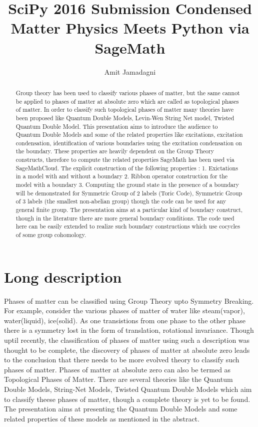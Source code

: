 \documentclass[a4paper,10pt]{article}
\title{SciPy 2016 Submission Condensed Matter Physics Meets Python via SageMath}
\author{Amit Jamadagni}
\date{}
\begin{document}
\maketitle

\begin{abstract}
Group theory has been used to classify various phases of matter, but the same cannot be applied to phases of matter at absolute zero which are called as topological phases of matter. 
In order to classify such topological phases of matter many theories have been proposed like Quantum Double Models, Levin-Wen String Net model, Twisted Quantum Double Model. This presentation aims to 
introduce the audience to Quantum Double Models and some of the related properties like excitations, excitation condensation, identification of various boundaries using 
the excitation condensation on the boundary. These properties are heavily dependent on the Group Theory constructs, therefore to compute the related properties SageMath has been used via SageMathCloud. 
The explicit construction of the following properties : 
 1. Exictations in a model with and without a boundary
 2. Ribbon operator construction for the model with a boundary
 3. Computing the ground state in the presence of a boundary
will be demonstrated for Symmetric Group of 2 labels (Toric Code), Symmetric Group of 3 labels (the smallest non-abelian group) though the code can be used for any general finite group. 
The presentation aims at a particular kind of boundary construct, though in the literature there are more general boundary conditions. 
The code used here can be easily extended to realize such boundary constructions which use cocycles of some group cohomology.    
\end{abstract}

\section{Long description}

Phases of matter can be classified using Group Theory upto Symmetry Breaking. For example, consider the various phases of matter of water like steam(vapor), water(liquid), ice(solid). As one
transistions from one phase to the other phase there is a symmetry lost in the form of translation, rotational invariance. Though uptil recently, the classification of phases of matter using
such a description was thought to be complete, the discovery of phases of matter at absolute zero leads to the conclusion that there needs to be more evolved theory to classify such phases of   
matter. Phases of matter at absolute zero can also be termed as Topological Phases of Matter. There are several theories like the Quantum Double Models, String-Net Models, Twisted Quantum Double
Models which aim to classify theese phases of matter, though a complete theory is yet to be found. The presentation aims at presenting the Quantum Double Models and some related properties 
of these models as mentioned in the abstract.
\end{document}

